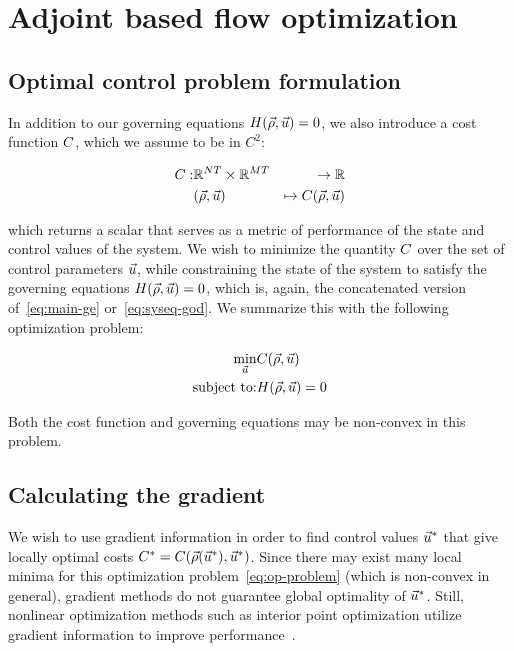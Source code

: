 
\section{Adjoint based flow optimization\label{sec:Adjoint-method}}


\subsection{Optimal control problem formulation\label{par:Optimization-Problem}}

In addition to our governing equations $\sys\left(\state,\control\right)=0$,
we also introduce a cost function $C$, which we assume to be
in $C^{2}$:

\begin{eqnarray*}
	\cost: & \mathbb{R}^{\nlinks T}\times\mathbb{R}^{\ncontrols T} & \rightarrow\mathbb{R}\\
	& \left(\state,\control\right) & \mapsto\cost\left(\state,\control\right)
\end{eqnarray*}


which returns a scalar that serves as a metric of performance of the
state and control values of the system. We wish to minimize the quantity
$C$ over the set of control parameters $\vec{u}$, while constraining
the state of the system to satisfy the governing equations $\sys\left(\state,\control\right)=0$,
which is, again, the concatenated version of~\eqref{eq:main-ge} or~\eqref{eq:syseq-god}.
We summarize this with the following optimization problem:

\begin{eqnarray}
	\underset{\control}{\min} & \cost\left(\state,\control\right)\nonumber \\
	\text{subject to:} & \sys\left(\state,\control\right)=0\label{eq:op-problem}
\end{eqnarray}


Both the cost function and governing equations may be non-convex in
this problem.


\subsection{Calculating the gradient\label{par:Calculating-the-gradient}}

We wish to use gradient information in order to find control values
$\vec{u}^{*}$ that give locally optimal costs $\cost^{*}=\cost\left(\state\left(\control^{*}\right),\control^{*}\right)$.
Since there may exist many local minima for this optimization problem~\eqref{eq:op-problem}
(which is non-convex in general), gradient\emph{ }methods do not guarantee
global optimality of $\vec{u}^{*}$\emph{. }Still, nonlinear optimization
methods such as interior point optimization utilize gradient information
to improve performance~\cite{Andreas2005}.

